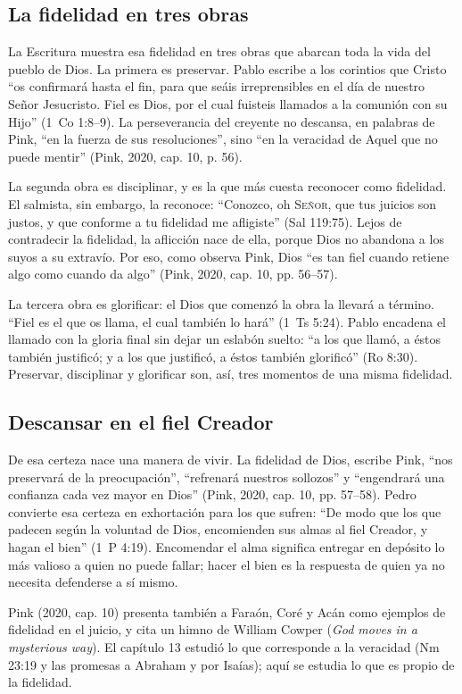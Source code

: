 \documentclass[11pt,letterpaper]{article}
\newcommand{\SENOR}{\textsc{Señor}}
\begin{document}
\subsection{La fidelidad en tres obras}
La Escritura muestra esa fidelidad en tres obras que abarcan toda la vida del pueblo de Dios. La primera es preservar. Pablo escribe a los corintios que Cristo ``os confirmará hasta el fin, para que seáis irreprensibles en el día de nuestro Señor Jesucristo. Fiel es Dios, por el cual fuisteis llamados a la comunión con su Hijo'' (1~Co 1:8--9). La perseverancia del creyente no descansa, en palabras de Pink, ``en la fuerza de sus resoluciones'', sino ``en la veracidad de Aquel que no puede mentir'' (Pink, 2020, cap. 10, p. 56).

La segunda obra es disciplinar, y es la que más cuesta reconocer como fidelidad. El salmista, sin embargo, la reconoce: ``Conozco, oh \SENOR, que tus juicios son justos, y que conforme a tu fidelidad me afligiste'' (Sal 119:75). Lejos de contradecir la fidelidad, la aflicción nace de ella, porque Dios no abandona a los suyos a su extravío. Por eso, como observa Pink, Dios ``es tan fiel cuando retiene algo como cuando da algo'' (Pink, 2020, cap. 10, pp. 56--57).

La tercera obra es glorificar: el Dios que comenzó la obra la llevará a término. ``Fiel es el que os llama, el cual también lo hará'' (1~Ts 5:24). Pablo encadena el llamado con la gloria final sin dejar un eslabón suelto: ``a los que llamó, a éstos también justificó; y a los que justificó, a éstos también glorificó'' (Ro 8:30). Preservar, disciplinar y glorificar son, así, tres momentos de una misma fidelidad.

\subsection{Descansar en el fiel Creador}
De esa certeza nace una manera de vivir. La fidelidad de Dios, escribe Pink, ``nos preservará de la preocupación'', ``refrenará nuestros sollozos'' y ``engendrará una confianza cada vez mayor en Dios'' (Pink, 2020, cap. 10, pp. 57--58). Pedro convierte esa certeza en exhortación para los que sufren: ``De modo que los que padecen según la voluntad de Dios, encomienden sus almas al fiel Creador, y hagan el bien'' (1~P 4:19). Encomendar el alma significa entregar en depósito lo más valioso a quien no puede fallar; hacer el bien es la respuesta de quien ya no necesita defenderse a sí mismo.

\begin{nota}[Precisión]
Pink (2020, cap. 10) presenta también a Faraón, Coré y Acán como ejemplos de fidelidad en el juicio, y cita un himno de William Cowper (\emph{God moves in a mysterious way}). El capítulo 13 estudió lo que corresponde a la veracidad (Nm 23:19 y las promesas a Abraham y por Isaías); aquí se estudia lo que es propio de la fidelidad.
\end{nota}
\end{document}
